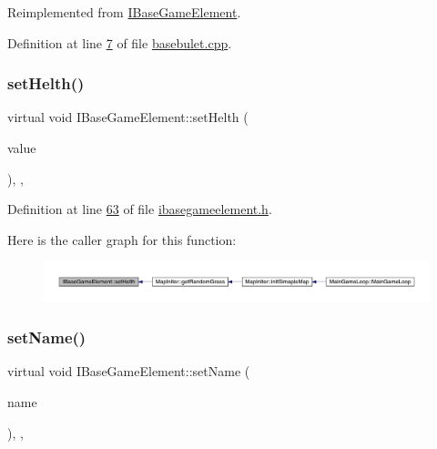 Reimplemented from \hyperlink{a00137_a71d8528482d5be16100ad56dbfd4aae9}{I\+Base\+Game\+Element}.



Definition at line \hyperlink{a00032_source_l00007}{7} of file \hyperlink{a00032_source}{basebulet.\+cpp}.

\mbox{\label{a00137_a2f95e7a61b5db7f2fbbfd32ff786f58c}} 
\subsubsection{\texorpdfstring{set\+Helth()}{setHelth()}}
{\footnotesize\ttfamily virtual void I\+Base\+Game\+Element\+::set\+Helth (\begin{DoxyParamCaption}\item[{\hyperlink{a00161}{Infinity\+Double} $\ast$}]{value }\end{DoxyParamCaption})\hspace{0.3cm}{\ttfamily [inline]}, {\ttfamily [virtual]}, {\ttfamily [inherited]}}



Definition at line \hyperlink{a00047_source_l00063}{63} of file \hyperlink{a00047_source}{ibasegameelement.\+h}.

Here is the caller graph for this function\+:
\nopagebreak
\begin{figure}[H]
\begin{center}
\leavevmode
\includegraphics[width=350pt]{d2/df5/a00137_a2f95e7a61b5db7f2fbbfd32ff786f58c_icgraph}
\end{center}
\end{figure}
\mbox{\label{a00137_a874f246d3249a989750e3db85ea4bfcd}} 
\subsubsection{\texorpdfstring{set\+Name()}{setName()}}
{\footnotesize\ttfamily virtual void I\+Base\+Game\+Element\+::set\+Name (\begin{DoxyParamCaption}\item[{Q\+String}]{name }\end{DoxyParamCaption})\hspace{0.3cm}{\ttfamily [inline]}, {\ttfamily [virtual]}, {\ttfamily [inherited]}}



